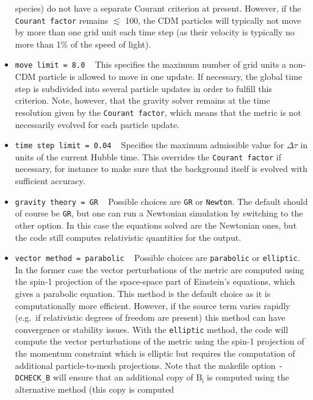 \documentclass[a4paper,10pt]{article}
\begin{document}
\begin{itemize}
 species) do not have a separate Courant criterion at present. However, if the \texttt{Courant factor} remains $\lesssim$ 100, the CDM
 particles will typically not move by more than one grid unit each time step (as their velocity is typically no more than 1\% of the speed
 of light).
 \item[] \hspace{-25pt}\texttt{move limit = 8.0} ~ This specifies the maximum number of grid units a non-CDM particle is allowed to move in
 one update. If necessary, the global time step is subdivided into several particle updates in order to fulfill this criterion. Note,
 however, that the gravity solver remains at the time resolution given by the \texttt{Courant factor}, which means that the metric is not
 necessarily evolved for each particle update.
 \item[] \hspace{-25pt}\texttt{time step limit = 0.04} ~ Specifies the maximum admissible value for $\mathsf{\Delta\tau}$ in units of the
 current Hubble time. This overrides the \texttt{Courant factor} if necessary, for instance to make sure that the background itself is
 evolved with sufficient accuracy.
 \item[] \hspace{-25pt}\texttt{gravity theory = GR} ~ Possible choices are \texttt{GR} or \texttt{Newton}. The default should of course be
 \texttt{GR}, but one can run a Newtonian simulation by switching to the other option. In this case the equations solved are the Newtonian
 ones, but the code still computes relativistic quantities for the output.
 \item[] \hspace{-25pt}\texttt{vector method = parabolic} ~ Possible choices are \texttt{parabolic} or \texttt{elliptic}. In the former case
 the vector perturbations of the metric are computed using the spin-1 projection of the space-space part of Einstein's equations, which
 gives a parabolic equation. This method is the default choice as it is computationally more efficient. However, if the source term varies
 rapidly (e.g.\ if relativistic degrees of freedom are present) this method can have convergence or stability issues. With the
 \texttt{elliptic} method, the code will compute the vector perturbations of the metric using the spin-1 projection of the momentum
 constraint which is elliptic but requires the computation of additional particle-to-mesh projections. Note that the makefile option
 \texttt{-DCHECK\_B} will ensure that an additional copy of B$_\mathsf{i}$ is computed using the alternative method (this copy is computed

\end{itemize}
\end{document}
